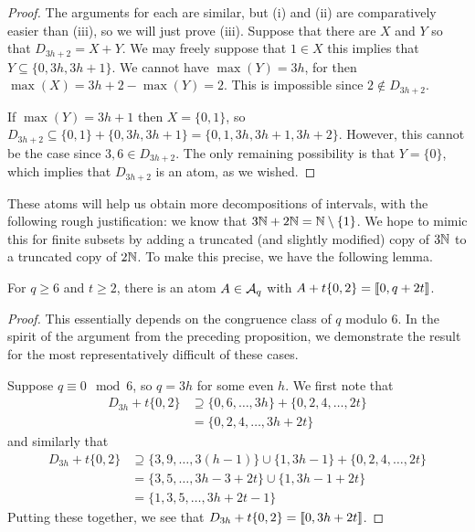 \begin{proof}
	The arguments for each are similar, but (i) and (ii) are comparatively easier than (iii), so we will just prove (iii).
	Suppose that there are $X$ and $Y$ so that $D_{3h+2} = X + Y$.
	We may freely suppose that $1\in X$ this implies that $Y \subseteq \{0,3h,3h+1\}$.
	We cannot have $\max(Y) = 3h$, for then $\max(X) = 3h+2 - \max(Y) = 2$.
	This is impossible since $2\notin D_{3h+2}$.
	
	If $\max(Y) = 3h+1$ then $X = \{0,1\}$, so $D_{3h+2} \subseteq \{0,1\} + \{0,3h,3h+1\} = \{0,1,3h,3h+1,3h+2\}$.
	However, this cannot be the case since $3,6\in D_{3h+2}$.
	The only remaining possibility is that $Y = \{0\}$, which implies that $D_{3h+2}$ is an atom, as we wished.
\end{proof}

These atoms will help us obtain more decompositions of intervals, with the following rough justification: we know that $3\mathbb{N} + 2\mathbb{N} = \mathbb{N} \setminus\{1\}$. 
We hope to mimic this for finite subsets by adding a truncated (and slightly modified) copy of $3\mathbb{N}$ to a truncated copy of $2\mathbb{N}$.
To make this precise, we have the following lemma.

\begin{lemma} \label{lemma:many 2s types}
	For $q \ge 6$ and $t\ge 2$, there is an atom $A\in \mathcal{A}_q$ with $A + t\{0,2\} = \llbracket 0, q+2t \rrbracket$.
\end{lemma}

\begin{proof}
	This essentially depends on the congruence class of $q$ modulo $6$.
	In the spirit of the argument from the preceding proposition, we demonstrate the result for the most representatively difficult of these cases.
	
	Suppose $q \equiv 0 \mod 6$, so $q = 3h$ for some even $h$.
	We first note that
	\begin{align*}
	D_{3h} + t\{0,2\} 
	&\supseteq \{0,6,\dots, 3h\} + \{0,2,4,\dots, 2t\} \\
	& = \{0,2,4,\dots, 3h+2t \}
	\end{align*}
	and similarly that
	\begin{align*}
	D_{3h} + t\{0,2\}
	&\supseteq \{3,9,\dots, 3(h-1) \}\cup\{1,3h-1\} + \{0,2,4,\dots, 2t \} \\
	&= \{3,5,\dots, 3h-3 + 2t \}\cup \{1,3h-1 + 2t \} \\
	&= \{1,3,5,\dots, 3h+2t-1 \}
	\end{align*}
	Putting these together, we see that $D_{3h} + t\{0,2\} = \llbracket 0,3h+2t \rrbracket$.
\end{proof}

